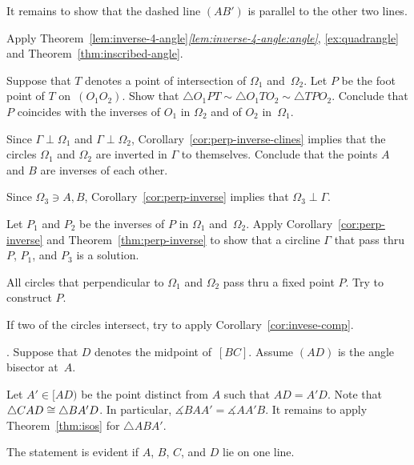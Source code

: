 It remains to show that the dashed line $(AB')$ is parallel to the other two lines.

Apply Theorem~\ref{lem:inverse-4-angle}\textit{\ref{lem:inverse-4-angle:angle}}, 
\ref{ex:quadrangle}
and Theorem~\ref{thm:inscribed-angle}.

Suppose that $T$ denotes a point of intersection of $\Omega_1$ and~$\Omega_2$.
Let $P$ be the foot point of $T$ on~$(O_1O_2)$.
Show that
$\triangle O_1PT
\sim \triangle O_1TO_2
\sim \triangle TPO_2$.
Conclude that $P$ coincides with the inverses of $O_1$ in $\Omega_2$ and of $O_2$ in~$\Omega_1$.

Since $\Gamma\perp\Omega_1$ and $\Gamma\perp\Omega_2$,
Corollary~\ref{cor:perp-inverse-clines} 
implies that
the circles $\Omega_1$ and $\Omega_2$ are inverted in $\Gamma$ 
to themselves.
Conclude that the points $A$ and $B$ are inverses of each other.

Since $\Omega_3\ni A,B$,
Corollary~\ref{cor:perp-inverse} implies that
$\Omega_3\perp \Gamma$.

Let $P_1$ and $P_2$ be the inverses of $P$ 
in $\Omega_1$ and~$\Omega_2$.
Apply Corollary~\ref{cor:perp-inverse} and Theorem~\ref{thm:perp-inverse} to 
show that a circline $\Gamma$ that pass thru $P$, $P_1$, and $P_3$ is a solution.

All circles that perpendicular to $\Omega_1$ and $\Omega_2$ pass thru a fixed point $P$.
Try to construct $P$.

If two of the circles intersect, try to apply Corollary~\ref{cor:invese-comp}.

\setcounter{eqtn}{0}

\parbf{\ref{ex:abs-bisect=median}}.
Suppose that $D$ denotes the midpoint of~$[BC]$.
Assume $(AD)$ is the angle bisector at~$A$.

Let $A'\in [AD)$ be the point distinct from $A$ such that $AD=A'D$.
Note that $\triangle CAD\z\cong\triangle BA'D$.
In particular, $\measuredangle BAA'=\measuredangle AA'B$.
It remains to apply Theorem~\ref{thm:isos} for $\triangle ABA'$.

The statement is evident if $A$, $B$, $C$, and $D$ lie on one line.

